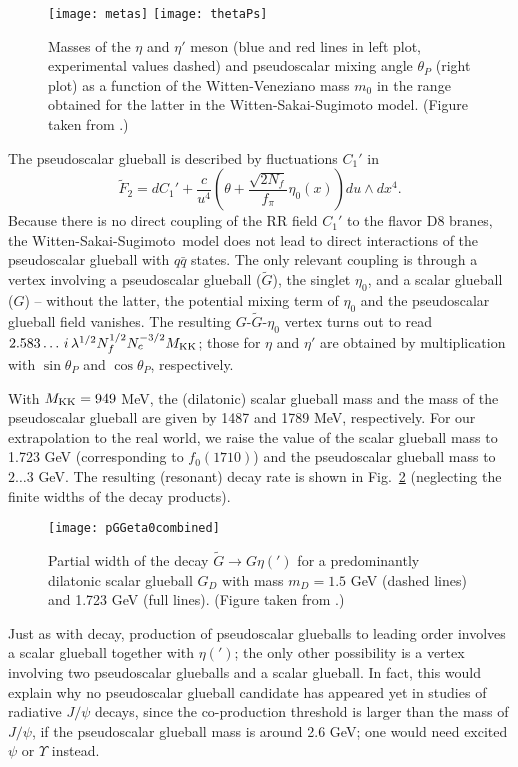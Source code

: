 \documentclass[a4paper]{PoS}
\newcommand{\be}{\begin{equation}}
\newcommand{\ee}{\end{equation}}
\newcommand{\6}{\partial }
\newcommand{\8}{T_{\rm D8}}
\newcommand{\MKK}{M_{\rm KK}}
\newcommand{\UKK}{U_{\rm KK}}
\def\BRb{\cite{1510.07605}}
\def\PLB{\cite{Brunner:2016ygk}}
\def\WSS{Witten-Sakai-Sugimoto}
\begin{document}
\begin{figure}
\texttt{[image: metas]}
\texttt{[image: thetaPs]}
\caption{Masses of the $\eta$ and $\eta'$ meson (blue and red lines in left plot, experimental values dashed) and pseudoscalar mixing angle $\theta_P$ (right plot)
as a function of the Witten-Veneziano mass $m_0$ in the range obtained for the latter in the Witten-Sakai-Sugimoto model. (Figure taken from \BRb.) }
\label{figmetas}
\end{figure}


The pseudoscalar glueball is described by fluctuations $C_1'$ in
\be\tilde F_2=
dC_1'+\frac{c}{u^4}%
\left( \theta+\frac{\sqrt{2N_f}}{f_\pi}\eta_0(x) \right)du \wedge dx^4.
\ee
Because there is no direct coupling of the RR field $C_1'$ to the flavor D8 branes, the \WSS\ model
does not lead to direct interactions of the pseudoscalar glueball with $q\bar q$ states.
The only relevant coupling is through a vertex involving a pseudoscalar glueball ($\tilde G$), the singlet $\eta_0$, and
a scalar glueball ($G$) -- without the latter, the potential mixing term of $\eta_0$ and
the pseudoscalar glueball field vanishes. The resulting $G$-$\tilde G$-$\eta_0$ vertex
turns out to read
$
2.583\ldots\,i\,\lambda^{1/2} N_f^{1/2} N_c^{-3/2}\MKK
$; those for $\eta$ and $\eta'$ are obtained by multiplication with $\sin\theta_P$ and $\cos\theta_P$, respectively.

With $\MKK=949$ MeV, the (dilatonic) scalar glueball mass and the mass of the pseudoscalar glueball
are given by 1487 and 1789 MeV, respectively. For our extrapolation to the real world, we raise the value
of the scalar glueball mass to 1.723 GeV (corresponding to $f_0(1710)$) and the pseudoscalar glueball
mass to $2\ldots 3$ GeV. The resulting (resonant) decay rate is shown in Fig.~\ref{figdecayGTetaG} (neglecting the finite widths of the decay products).
\begin{figure}
\centerline{\texttt{[image: pGGeta0combined]}}
\caption{Partial width of the decay $\tilde{G}\to G\eta{(')}$ 
for a predominantly dilatonic scalar glueball $G_D$ with
mass $m_D=1.5$ GeV (dashed lines) and 1.723 GeV (full lines). (Figure taken from \PLB.)
}
\label{figdecayGTetaG}
\end{figure}

Just as with decay, production of pseudoscalar glueballs to leading order involves a scalar glueball together with
$\eta(')$; the only other possibility is a vertex involving two pseudoscalar glueballs and a scalar glueball.
In fact, this would explain why no pseudoscalar glueball candidate has appeared yet in studies of radiative $J/\psi$ decays,
since the co-production threshold is larger than the mass of $J/\psi$, if the pseudoscalar glueball mass is around 2.6 GeV;
one would need excited $\psi$ or $\Upsilon$ instead.
\end{document}
